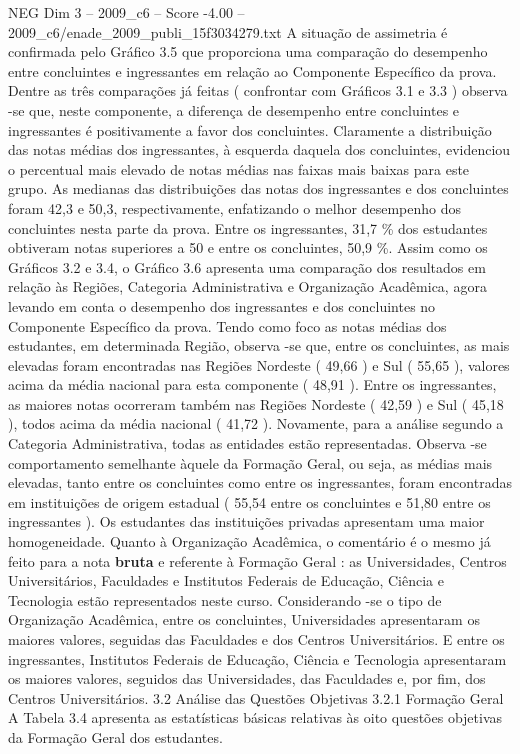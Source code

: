 \begin{textsample}{NEG Dim 3 – 2009\_c6 – Score -4.00 – 2009\_c6/enade\_2009\_publi\_15f3034279.txt}
A situação de assimetria é confirmada pelo Gráfico 3.5 que proporciona uma comparação do desempenho entre concluintes e ingressantes em relação ao Componente Específico da prova.
Dentre as três comparações já feitas ( confrontar com Gráficos 3.1 e 3.3 ) observa -se que, neste componente, a diferença de desempenho entre concluintes e ingressantes é positivamente a favor dos concluintes.
Claramente a distribuição das notas médias dos ingressantes, à esquerda daquela dos concluintes, evidenciou o percentual mais elevado de notas médias nas faixas mais baixas para este grupo.
As medianas das distribuições das notas dos ingressantes e dos concluintes foram 42,3 e 50,3, respectivamente, enfatizando o melhor desempenho dos concluintes nesta parte da prova.
Entre os ingressantes, 31,7 \% dos estudantes obtiveram notas superiores a 50 e entre os concluintes, 50,9 \%.
Assim como os Gráficos 3.2 e 3.4, o Gráfico 3.6 apresenta uma comparação dos resultados em relação às Regiões, Categoria Administrativa e Organização Acadêmica, agora levando em conta o desempenho dos ingressantes e dos concluintes no Componente Específico da prova.
Tendo como foco as notas médias dos estudantes, em determinada Região, observa -se que, entre os concluintes, as mais elevadas foram encontradas nas Regiões Nordeste ( 49,66 ) e Sul ( 55,65 ), valores acima da média nacional para esta componente ( 48,91 ).
Entre os ingressantes, as maiores notas ocorreram também nas Regiões Nordeste ( 42,59 ) e Sul ( 45,18 ), todos acima da média nacional ( 41,72 ).
Novamente, para a análise segundo a Categoria Administrativa, todas as entidades estão representadas.
Observa -se comportamento semelhante àquele da Formação Geral, ou seja, as médias mais elevadas, tanto entre os concluintes como entre os ingressantes, foram encontradas em instituições de origem estadual ( 55,54 entre os concluintes e 51,80 entre os ingressantes ).
Os estudantes das instituições privadas apresentam uma maior homogeneidade.
Quanto à Organização Acadêmica, o comentário é o mesmo já feito para a nota \textbf{bruta} e referente à Formação Geral : as Universidades, Centros Universitários, Faculdades e Institutos Federais de Educação, Ciência e Tecnologia estão representados neste curso.
Considerando -se o tipo de Organização Acadêmica, entre os concluintes, Universidades apresentaram os maiores valores, seguidas das Faculdades e dos Centros Universitários.
E entre os ingressantes, Institutos Federais de Educação, Ciência e Tecnologia apresentaram os maiores valores, seguidos das Universidades, das Faculdades e, por fim, dos Centros Universitários. 3.2 Análise das Questões Objetivas 3.2.1 Formação Geral A Tabela 3.4 apresenta as estatísticas básicas relativas às oito questões objetivas da Formação Geral dos estudantes.

\end{textsample}
